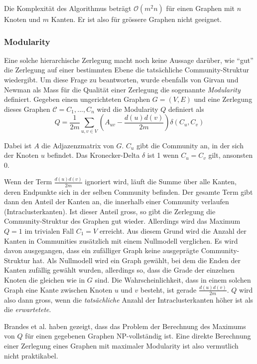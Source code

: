 Die Komplexit\"at des Algorithmus betr\"agt $\mathcal{O}(m^2n)$ f\"ur
einen Graphen mit $n$ Knoten und $m$ Kanten. Er ist also f\"ur
gr\"ossere Graphen nicht geeignet.

\subsubsection{Modularity}
\label{sec:modularity}

Eine solche hierarchische Zerlegung macht noch keine Aussage
dar\"uber, wie ``gut'' die Zerlegung auf einer bestimmten Ebene die
tats\"achliche Community-Struktur wiedergibt. Um diese Frage zu
beantworten, wurde ebenfalls von Girvan und Newman als Mass f\"ur die
Qualit\"at einer Zerlegung die sogenannte \emph{Modularity}
definiert\cite{Newman2004}. Gegeben einen ungerichteten Graphen $G=(V,
E)$ und eine Zerlegung dieses Graphen $\mathcal{C} = C_1, ..., C_n$
wird die Modularity $Q$ definiert als
\begin{equation}
  \label{eq:modularity}
  Q =
  \frac{1}{2m}\sum_{u, v \in
    V}\left(A_{uv}-\frac{d(u)d(v)}{2m}\right)\delta\left(C_u, C_v\right)
\end{equation}

Dabei ist $A$ die Adjazenzmatrix von $G$. $C_u$ gibt die Community an,
in der sich der Knoten $u$ befindet. Das Kronecker-Delta $\delta$
ist 1 wenn $C_u = C_v$ gilt, ansonsten 0.

Wenn der Term $\frac{d(u)d(v)}{2m}$ ignoriert wird, l\"auft die Summe
\"uber alle Kanten, deren Endpunkte sich in der selben Community
befinden. Der gesamte Term gibt dann den Anteil der Kanten an, die
innerhalb einer Community verlaufen (Intraclusterkanten). Ist dieser Anteil gross, so gibt
die Zerlegung die Community-Struktur des Graphen gut
wieder. Allerdings wird das Maximum $Q = 1$ im trivialen Fall $C_1 =
V$ erreicht. Aus diesem Grund wird die Anzahl der Kanten in
Communities zus\"atzlich mit einem Nullmodell verglichen. Es wird
davon ausgegangen, dass ein zuf\"alliger Graph keine ausgepr\"agte
Community-Struktur hat. Als Nullmodell wird ein Graph gew\"ahlt, bei
dem die Enden der Kanten zuf\"allig gew\"ahlt wurden, allerdings so,
dass die Grade der einzelnen Knoten die gleichen wie in $G$ sind.  Die
Wahrscheinlichkeit, dass in einem solchen Graph eine Kante zwischen
Knoten $u$ und $v$ besteht, ist gerade $\frac{d(u)d(v)}{2m}$. $Q$ wird
also dann gross, wenn die \emph{tats\"achliche} Anzahl der
Intraclusterkanten h\"oher ist als die \emph{erwartetete}.

Brandes et al. haben gezeigt, dass das Problem der Berechnung des
Maximums von $Q$ f\"ur einen gegebenen Graphen NP-vollst\"andig
ist\cite{DBLP:journals/tkde/BrandesDGGHNW08}. Eine direkte Berechnung
einer Zerlegung eines Graphen mit maximaler Modularity ist also
vermutlich nicht praktikabel.

